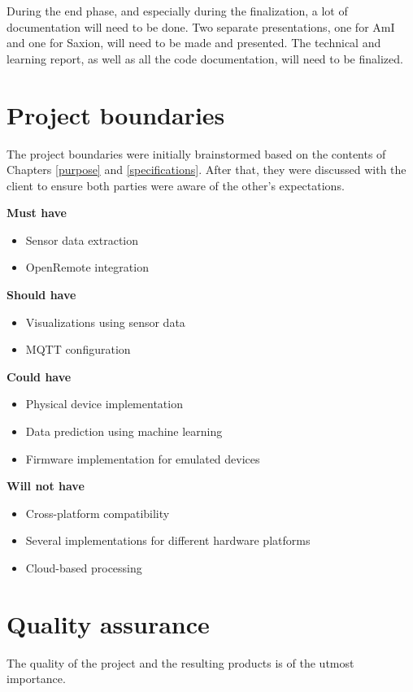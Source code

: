 \documentclass{report}
\begin{document}
	During the end phase, and especially during the finalization, a lot of documentation will need to be done. Two separate presentations, one for AmI and one for Saxion, will need to be made and presented. The technical and learning report, as well as all the code documentation, will need to be finalized. 
	
	\chapter{Project boundaries} \label{project_boundaries}
	The project boundaries were initially brainstormed based on the contents of Chapters \ref{purpose} and \ref{specifications}. After that, they were discussed with the client to ensure both parties were aware of the other's expectations. 
	
	\textbf{Must have}
	\begin{itemize}
		\item Sensor data extraction
		\item OpenRemote integration
	\end{itemize}
	
	\textbf{Should have}
	\begin{itemize}
		\item Visualizations using sensor data
		\item MQTT configuration
	\end{itemize}
	
	\textbf{Could have}
	\begin{itemize}
		\item Physical device implementation
		\item Data prediction using machine learning
		\item Firmware implementation for emulated devices
	\end{itemize}
	
	\textbf{Will not have}
	\begin{itemize}
		\item Cross-platform compatibility
		\item Several implementations for different hardware platforms 
		\item Cloud-based processing
	\end{itemize}
	
	
	\chapter{Quality assurance}\label{quality_assurance}
	The quality of the project and the resulting products is of the utmost importance. 
	
\end{document}
